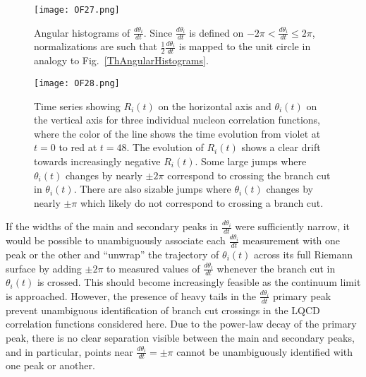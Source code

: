 %
\begin{figure}[!ht]
  \centering
  \texttt{[image: OF27.png]}
  \caption{
  Angular histograms of $\frac{d\theta_i}{dt}$. 
  Since $\frac{d\theta_i}{dt}$ is defined on $-2\pi < \frac{d\theta_i}{dt} \leq 2\pi$, 
  normalizations are such that $\frac{1}{2}\frac{d\theta_i}{dt}$ is mapped to the unit circle in analogy to 
  Fig.~\ref{ThAngularHistograms}.}
  \label{dThdtAngularHistograms}
\end{figure}
%



\begin{figure}[!ht]
  \centering
  \texttt{[image: OF28.png]}
  \caption{
  Time series showing $R_i(t)$ on the horizontal axis and $\theta_i(t)$ on the vertical axis for three 
  individual nucleon correlation functions,
  where the color of the line shows the time evolution from violet at $t=0$ to red at $t=48$. 
  The evolution of $R_i(t)$ shows a clear drift towards increasingly negative $R_i(t)$. 
  Some large jumps where $\theta_i(t)$ changes by nearly $\pm 2\pi$  
  correspond to crossing the branch cut in $\theta_i(t)$. 
  There are also sizable jumps where $\theta_i(t)$ changes by nearly $\pm\pi$ which likely do not 
 correspond to crossing a branch cut. 
  }
  \label{Tracks}
\end{figure}
%


If the widths of the main and secondary peaks in $\frac{d\theta_i}{dt}$  were sufficiently narrow, it would be possible to 
unambiguously associate each $\frac{d\theta_i}{dt}$ measurement with one peak or the other and ``unwrap'' the 
trajectory of $\theta_i(t)$ across its full Riemann surface by adding $\pm 2\pi$ to measured values of $\frac{d\theta_i}{dt}$ 
whenever the branch cut in $\theta_i(t)$ is crossed. 
This should become increasingly feasible as the continuum limit is approached. 
However, the presence of heavy tails in the $\frac{d\theta_i}{dt}$ primary peak prevent unambiguous identification of branch cut 
crossings in the LQCD correlation functions considered here. 
Due to the  power-law decay of the primary peak, there is no clear separation visible between the main and secondary peaks, 
and in particular, points near $\frac{d\theta_i}{dt} = \pm \pi$ cannot be unambiguously identified with one peak or another. 





